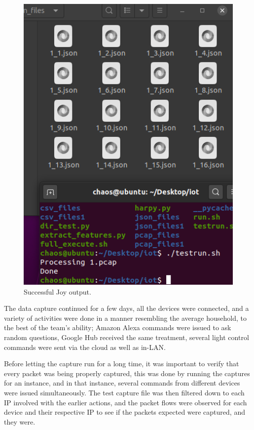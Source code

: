 \documentclass{article}
\begin{document}
\begin{figure}[!ht]
    \centering
    \includegraphics[width=13cm]{InputSystem/JoyOutput.png}
    \caption{Successful Joy output.} 
    \label{fig:joyout}
\end{figure}

The data capture continued for a few days, all the devices were
connected, and a variety of activities were done in a manner resembling
the average household, to the best of the team's ability; Amazon Alexa
commands were issued to ask random questions, Google Hub received the
same treatment, several light control commands were sent via the cloud
as well as in-LAN.\newline

Before letting the capture run for a long time, it was important to
verify that every packet was being properly captured, this was done by
running the captures for an instance, and in that instance, several
commands from different devices were issued simultaneously. The test
capture file was then filtered down to each IP involved with the earlier
actions, and the packet flows were observed for each device and their
respective IP to see if the packets expected were captured, and they
were.\pagebreak
\end{document}
